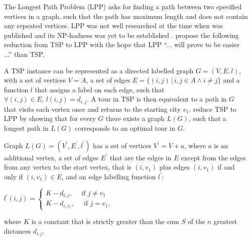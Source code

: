 \documentclass[a4paper,12pt]{article}
\begin{document}
The Longest Path Problem (LPP) asks for finding a path between two specified vertices in a graph, such that the path has maximum length and does not contain any repeated vertices. LPP was not well researched at the time when \citet{Hardgrave62} was published and its NP-hadness was yet to be established \citep{thebible}. \citet{Hardgrave62} propose the following reduction from TSP to LPP with the hope that LPP ``... will prove to be easier ...'' than TSP.

A TSP instance can be represented as a directed labelled graph $G = (V,E, l)$, with a set of vertices $V=A$, a set of edges $E = \{(i,j) \,|\, i,j \in A \wedge i \neq j\}$ and a function $l$ that assigns a label on each edge, such that $\forall (i,j) \in E, \, l(i,j) = d_{i,j}$. A tour in TSP is then equivalent to a path in $G$ that visits each vertex once and returns to the starting city $v_{1}$. \citet{Hardgrave62} reduce TSP to LPP by showing that for every $G$ there exists a graph $L(G)$, such that a longest path in $L(G)$ corresponds to an optimal tour in $G$.

Graph $L(G)=(V^{\prime},E^{\prime},l^{\prime})$ has a set of vertices $V^{\prime}=V + a$, where  $a$ is an additional vertex, a set of edges $E^{\prime}$ that are the edges in $E$ except from the edges from any vertex to the start vertex, that is $(i,v_{1})$ plus edges $(i,v_{1})$ if and only if $(i,v_{1}) \in E$, and an edge labelling function $l^{\prime}$:

$l^{\prime}(i,j) = \begin{cases}
K - d_{i,j}, \quad \textrm{ if } j \neq v_{1} \\
K - d_{i,v_{1}}, \quad \textrm{ if } j = v_{1}, 
\end{cases}$

where $K$ is a constant that is strictly greater than the sum $S$ of the $n$ greatest distances $d_{i,j}$.
\end{document}
